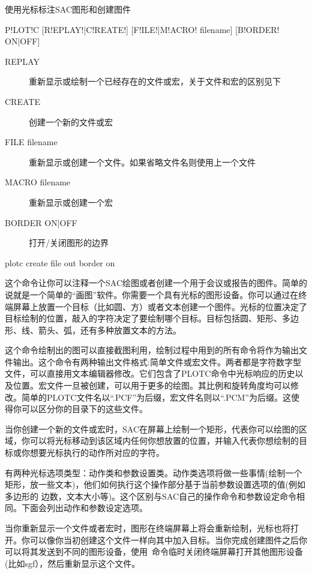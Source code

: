 \label{cmd:plotc}

使用光标标注SAC图形和创建图件

\begin{SACSTX}
P!LOT!C [R!EPLAY!|C!REATE!] [F!ILE!|M!ACRO! filename] [B!ORDER! ON|OFF]
\end{SACSTX}

\begin{description}
\item [REPLAY] 重新显示或绘制一个已经存在的文件或宏，关于文件和宏的区别见下
\item [CREATE] 创建一个新的文件或宏
\item [FILE filename] 重新显示或创建一个文件。如果省略文件名则使用上一个文件
\item [MACRO filename] 重新显示或创建一个宏
\item [BORDER ON|OFF] 打开/关闭图形的边界
\end{description}

\begin{SACDFT}
plotc create file out border on
\end{SACDFT}

这个命令让你可以注释一个SAC绘图或者创建一个用于会议或报告的图件。简单的说就是一个简单的``画图''软件。你需要一个具有光标的图形设备。你可以通过在终端屏幕上放置一个目标（比如圆、方）或者文本创建一个图件。光标的位置决定了目标绘制的位置，敲入的字符决定了要绘制哪个目标。目标包括圆、矩形、多边形、线、箭头、弧，还有多种放置文本的方法。

这个命令绘制出的图可以直接截图利用，绘制过程中用到的所有命令将作为输出文件输出。这个命令有两种输出文件格式:简单文件或宏文件。两者都是字符数字型文件，可以直接用文本编辑器修改。它们包含了PLOTC命令中光标响应的历史以及位置。宏文件一旦被创建，可以用于更多的绘图。其比例和旋转角度均可以修改。简单的PLOTC文件名以``.PCF''为后缀，宏文件名则以``.PCM''为后缀。这使得你可以区分你的目录下的这些文件。

当你创建一个新的文件或宏时，SAC在屏幕上绘制一个矩形，代表你可以绘图的区域，你可以将光标移动到该区域内任何你想放置的位置，并输入代表你想绘制的目标或你想要光标执行的动作所对应的字符。

有两种光标选项类型：动作类和参数设置类。动作类选项将做一些事情(绘制一个矩形，放一些文本)，他们如何执行这个操作部分基于当前参数设置选项的值(例如多边形的	边数，文本大小等)。这个区别与SAC自己的操作命令和参数设定命令相同。下面会列出动作和参数设定选项。

当你重新显示一个文件或者宏时，图形在终端屏幕上将会重新绘制，光标也将打开。你可以像你当初创建这个文件一样向其中加入目标。当你完成创建图件之后你可以将其发送到不同的图形设备，使用~命令临时关闭终端屏幕打开其他图形设备(比如sgf），然后重新显示这个文件。

